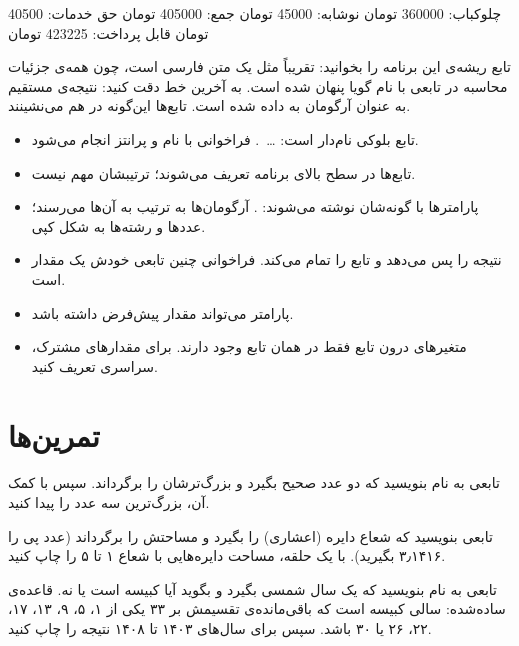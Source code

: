 \begin{outputfa}
چلوکباب: 360000 تومان
نوشابه: 45000 تومان
جمع: 405000 تومان
حق خدمات: 40500 تومان
قابل پرداخت: 423225 تومان
\end{outputfa}

تابع ریشه‌ی این برنامه را بخوانید: تقریباً مثل یک متن فارسی است، چون همه‌ی
جزئیات محاسبه در تابعی با نام گویا پنهان شده است. به آخرین خط دقت کنید:
نتیجه‌ی  مستقیم به عنوان آرگومان به 
داده شده است. تابع‌ها این‌گونه در هم می‌نشینند.

\begin{summary}
\begin{itemize}
  \item تابع بلوکی نام‌دار است: 
        \ldots\ . فراخوانی با نام و پرانتز انجام می‌شود.
  \item تابع‌ها در سطح بالای برنامه تعریف می‌شوند؛ ترتیبشان مهم نیست.
  \item پارامترها با گونه‌شان نوشته می‌شوند: . آرگومان‌ها
        به ترتیب به آن‌ها می‌رسند؛ عددها و رشته‌ها به شکل کپی.
  \item {} نتیجه را پس می‌دهد و تابع را تمام می‌کند.
        فراخوانی چنین تابعی خودش یک مقدار است.
  \item پارامتر می‌تواند مقدار پیش‌فرض داشته باشد.
  \item متغیرهای درون تابع فقط در همان تابع وجود دارند. برای مقدارهای
        مشترک،  سراسری تعریف کنید.
\end{itemize}
\end{summary}

\section*{تمرین‌ها}

\exercise تابعی به نام  بنویسید که دو عدد صحیح بگیرد و
بزرگ‌ترشان را برگرداند. سپس با کمک آن، بزرگ‌ترین سه عدد را پیدا کنید.

\exercise تابعی بنویسید که شعاع دایره (اعشاری) را بگیرد و مساحتش را
برگرداند (عدد پی را ۳٫۱۴۱۶ بگیرید). با یک حلقه، مساحت دایره‌هایی با شعاع
۱ تا ۵ را چاپ کنید.

\exercise تابعی به نام  بنویسید که یک سال شمسی
بگیرد و بگوید آیا کبیسه است یا نه. قاعده‌ی ساده‌شده: سالی کبیسه است که
باقی‌مانده‌ی تقسیمش بر ۳۳ یکی از ۱، ۵، ۹، ۱۳، ۱۷، ۲۲، ۲۶ یا ۳۰ باشد. سپس
برای سال‌های ۱۴۰۳ تا ۱۴۰۸ نتیجه را چاپ کنید.

